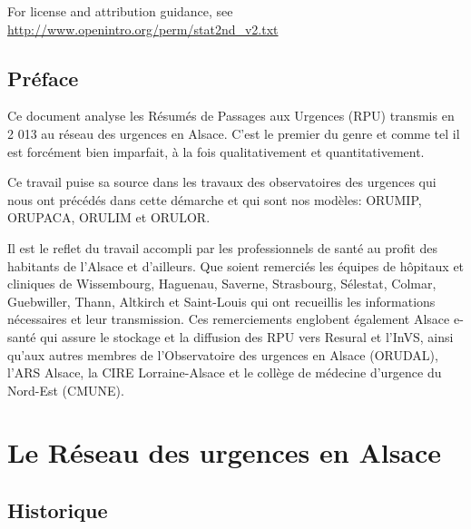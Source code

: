 \documentclass[12pt,english,french,twoside]{book}\usepackage[]{graphicx}\usepackage[]{color}
\begin{document}
\noindent For license and attribution guidance, see \url{http://www.openintro.org/perm/stat2nd_v2.txt}

\mainmatter

\tableofcontents
\listoftables
\listoffigures





\chapter*{Préface}


Ce document analyse les Résumés de Passages aux Urgences (RPU) transmis en 2 013 au réseau des urgences en Alsace. C'est le premier du genre et comme tel il est forcément bien imparfait, à la fois qualitativement et quantitativement.

Ce travail puise sa source dans les travaux des observatoires des urgences qui nous ont précédés dans cette démarche et qui sont nos modèles: ORUMIP, ORUPACA, ORULIM et ORULOR.

Il est le reflet du travail accompli par les professionnels de santé au profit des habitants de l'Alsace et d'ailleurs. Que soient remerciés les équipes de hôpitaux et cliniques de Wissembourg, Haguenau, Saverne, Strasbourg, Sélestat, Colmar, Guebwiller, Thann, Altkirch et Saint-Louis qui ont recueillis les informations nécessaires et leur transmission. Ces remerciements englobent également Alsace e-santé qui assure le stockage et la diffusion des RPU vers Resural et l'InVS, ainsi qu'aux autres membres de l'Observatoire des urgences en Alsace (ORUDAL), l'ARS Alsace, la CIRE Lorraine-Alsace et le collège de médecine d'urgence du Nord-Est (CMUNE).



\part{Le Réseau des urgences en Alsace}

\chapter{Historique}
\end{document}
